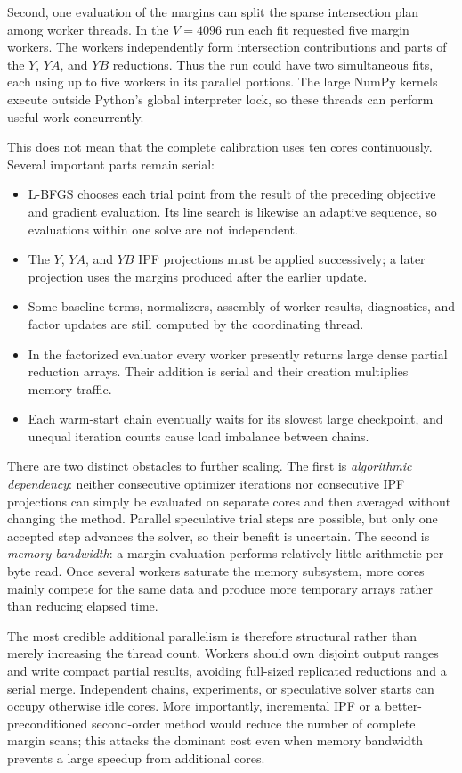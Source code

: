 \documentclass[11pt]{article}
\begin{document}
Second, one evaluation of the margins can split the sparse intersection plan
among worker threads.  In the $V=4096$ run each fit requested five margin
workers.  The workers independently form intersection contributions and
parts of the $Y$, $YA$, and $YB$ reductions.  Thus the run could have two
simultaneous fits, each using up to five workers in its parallel portions.
The large NumPy kernels execute outside Python's global interpreter lock, so
these threads can perform useful work concurrently.

This does not mean that the complete calibration uses ten cores continuously.
Several important parts remain serial:
\begin{itemize}
\item L-BFGS chooses each trial point from the result of the preceding
      objective and gradient evaluation.  Its line search is likewise an
      adaptive sequence, so evaluations within one solve are not independent.
\item The $Y$, $YA$, and $YB$ IPF projections must be applied successively;
      a later projection uses the margins produced after the earlier update.
\item Some baseline terms, normalizers, assembly of worker results,
      diagnostics, and factor updates are still computed by the coordinating
      thread.
\item In the factorized evaluator every worker presently returns large dense
      partial reduction arrays.  Their addition is serial and their creation
      multiplies memory traffic.
\item Each warm-start chain eventually waits for its slowest large checkpoint,
      and unequal iteration counts cause load imbalance between chains.
\end{itemize}

There are two distinct obstacles to further scaling.  The first is
\emph{algorithmic dependency}: neither consecutive optimizer iterations nor
consecutive IPF projections can simply be evaluated on separate cores and
then averaged without changing the method.  Parallel speculative trial
steps are possible, but only one accepted step advances the solver, so their
benefit is uncertain.  The second is \emph{memory bandwidth}: a margin
evaluation performs relatively little arithmetic per byte read.  Once several
workers saturate the memory subsystem, more cores mainly compete for the same
data and produce more temporary arrays rather than reducing elapsed time.

The most credible additional parallelism is therefore structural rather than
merely increasing the thread count.  Workers should own disjoint output
ranges and write compact partial results, avoiding full-sized replicated
reductions and a serial merge.  Independent chains, experiments, or
speculative solver starts can occupy otherwise idle cores.  More importantly,
incremental IPF or a better-preconditioned second-order method would reduce
the number of complete margin scans; this attacks the dominant cost even when
memory bandwidth prevents a large speedup from additional cores.
\end{document}

